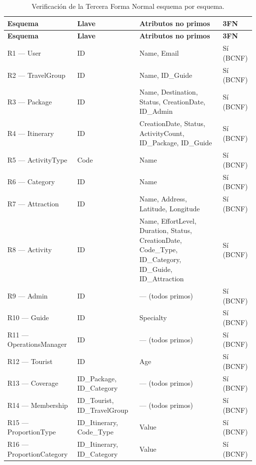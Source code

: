 \documentclass[11pt,a4paper]{article}
\begin{document}
{\footnotesize\setlength{\tabcolsep}{3pt}\renewcommand{\arraystretch}{1.15}
\begin{longtable}{|>{\raggedright\arraybackslash}p{3.88cm}|>{\raggedright\arraybackslash}p{3.98cm}|>{\raggedright\arraybackslash}p{5.78cm}|>{\raggedright\arraybackslash}p{1.68cm}|}
\caption{Verificación de la Tercera Forma Normal esquema por esquema.}\label{tab:3fn}\\ \hline
\rowcolor{gray!20} \textbf{Esquema} & \textbf{Llave} & \textbf{Atributos no primos} & \textbf{3FN} \\ \hline
\endfirsthead
\hline \rowcolor{gray!20} \textbf{Esquema} & \textbf{Llave} & \textbf{Atributos no primos} & \textbf{3FN} \\ \hline
\endhead
R1 — User & ID & Name, Email & Sí (BCNF) \\ \hline
R2 — TravelGroup & ID & Name, ID\_Guide & Sí (BCNF) \\ \hline
R3 — Package & ID & Name, Destination, Status, CreationDate, ID\_Admin & Sí (BCNF) \\ \hline
R4 — Itinerary & ID & CreationDate, Status, ActivityCount, ID\_Package, ID\_Guide & Sí (BCNF) \\ \hline
R5 — ActivityType & Code & Name & Sí (BCNF) \\ \hline
R6 — Category & ID & Name & Sí (BCNF) \\ \hline
R7 — Attraction & ID & Name, Address, Latitude, Longitude & Sí (BCNF) \\ \hline
R8 — Activity & ID & Name, EffortLevel, Duration, Status, CreationDate, Code\_Type, ID\_Category, ID\_Guide, ID\_Attraction & Sí (BCNF) \\ \hline
R9 — Admin & ID & — (todos primos) & Sí (BCNF) \\ \hline
R10 — Guide & ID & Specialty & Sí (BCNF) \\ \hline
R11 — OperationsManager & ID & — (todos primos) & Sí (BCNF) \\ \hline
R12 — Tourist & ID & Age & Sí (BCNF) \\ \hline
R13 — Coverage & ID\_Package, ID\_Category & — (todos primos) & Sí (BCNF) \\ \hline
R14 — Membership & ID\_Tourist, ID\_TravelGroup & — (todos primos) & Sí (BCNF) \\ \hline
R15 — ProportionType & ID\_Itinerary, Code\_Type & Value & Sí (BCNF) \\ \hline
R16 — ProportionCategory & ID\_Itinerary, ID\_Category & Value & Sí (BCNF) \\ \hline

\end{longtable}}
\end{document}
